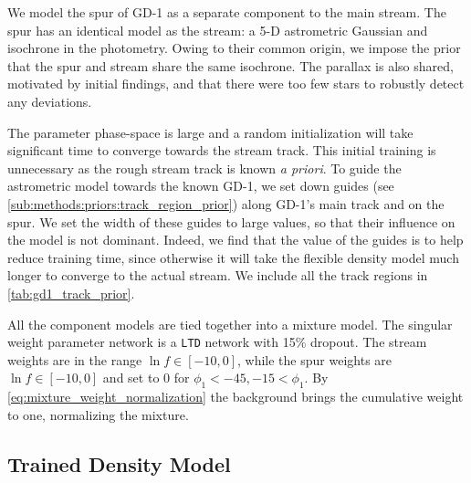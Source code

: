 \documentclass[twocolumn, linenumbers]{aastex631}
\newcommand{\stream}[1]{#1}
\begin{document}

        We model the spur of \stream{GD-1} as a separate component to the main
        stream. The spur has an identical model as the stream: a 5-D astrometric
        Gaussian and isochrone in the photometry. Owing to their common origin,
        we impose the prior that the spur and stream share the same isochrone.
        The parallax is also shared, motivated by initial findings, and that
        there were too few stars to robustly detect any deviations.


        The parameter phase-space is large and a random initialization will take
        significant time to converge towards the stream track. This initial
        training is unnecessary as the rough stream track is known \textit{a
        priori}.  To guide the astrometric model towards the known
        \stream{GD-1}, we set down guides (see
        \autoref{sub:methods:priors:track_region_prior}) along \stream{GD-1}'s
        main track and on the spur.  We set the width of these guides to large
        values, so that their influence on the model is not dominant. Indeed, we
        find that the value of the guides is to help reduce training time, since
        otherwise it will take the flexible density model much longer to
        converge to the actual stream.  We include all the track regions in
        \autoref{tab:gd1_track_prior}.

        All the component models are tied together into a mixture model.  The
        singular weight parameter network is a \texttt{LTD} network with 15\%
        dropout.  The stream weights are in the range $\ln f \in [-10, 0]$,
        while the spur weights are $\ln f \in [-10, 0]$ and set to 0 for $\phi_1
        < -45, -15 < \phi_1$.  By \autoref{eq:mixture_weight_normalization} the
        background brings the cumulative weight to one, normalizing the mixture.

    \subsection{Trained Density Model}\label{sub:results_gd1:results}
\end{document}
